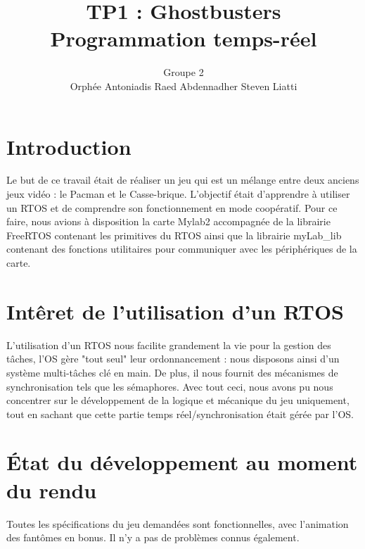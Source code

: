 \documentclass[a4paper]{article}
\title{TP1 : Ghostbusters \protect\\ Programmation temps-réel}
\author{Groupe 2 \\ Orphée Antoniadis \hspace{0.5cm} Raed Abdennadher \hspace{0.5cm} Steven Liatti}
\begin{document}
\maketitle

\section{Introduction}
Le but de ce travail était de réaliser un jeu qui est un mélange entre deux
anciens jeux vidéo : le Pacman et le Casse-brique. L'objectif était d'apprendre
à utiliser un RTOS et de comprendre son fonctionnement en mode coopératif. Pour
ce faire, nous avions à disposition la carte Mylab2 accompagnée de la librairie
FreeRTOS contenant les primitives du RTOS ainsi que la librairie myLab\_lib contenant
des fonctions utilitaires pour communiquer avec les périphériques de la carte.

\section{Intêret de l'utilisation d'un RTOS}
L'utilisation d'un RTOS nous facilite grandement la vie pour la gestion des tâches,
l'OS gère "tout seul" leur ordonnancement : nous disposons ainsi d'un système multi-tâches
clé en main. De plus, il nous fournit des mécanismes de synchronisation tels que les
sémaphores. Avec tout ceci, nous avons pu nous concentrer sur le développement de la
logique et mécanique du jeu uniquement, tout en sachant que cette partie temps réel/synchronisation
était gérée par l'OS.

\section{État du développement au moment du rendu}
Toutes les spécifications du jeu demandées sont fonctionnelles, avec l'animation des fantômes
en bonus. Il n'y a pas de problèmes connus également.
\end{document}
